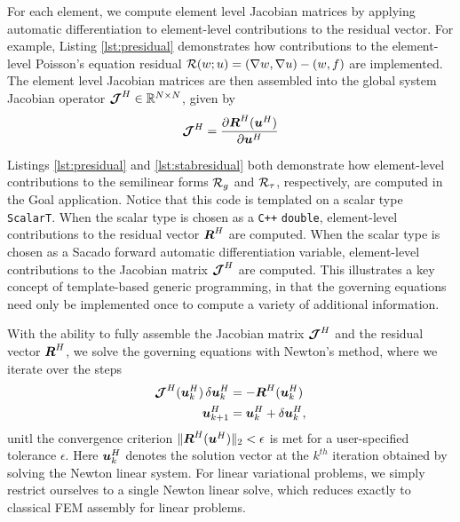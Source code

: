 For each element, we compute element level
Jacobian matrices by applying automatic
differentiation \cite{griewank2008evaluating} to element-level contributions
to the residual vector. For example, Listing \ref{lst:presidual} demonstrates
how contributions to the element-level Poisson's equation residual
$\mathcal{R}(w; u) = (\nabla w, \nabla u) - (w, f)$ are implemented. The element level
Jacobian matrices are then assembled into the global system Jacobian operator
$\boldsymbol{\mathcal{J}}^H \in \mathbb{R}^{N \times N}$, given by
%
\begin{gather}
\boldsymbol{\mathcal{J}}^H = \frac{\partial \boldsymbol{R}^H (\boldsymbol{u}^H) }{\partial \boldsymbol{u}^H}
\end{gather}

Listings \ref{lst:presidual} and \ref{lst:stabresidual} both demonstrate how
element-level contributions to the semilinear forms $\mathcal{R}_g$ and $\mathcal{R}_{\tau}$,
respectively, are computed in the Goal application. Notice that this code
is templated on a scalar type \texttt{ScalarT}. When the scalar type is
chosen as a \texttt{C++} \texttt{double}, element-level contributions to
the residual vector $\boldsymbol{R}^H$ are computed. When the scalar type is chosen
as a Sacado forward automatic differentiation variable, element-level
contributions to the Jacobian matrix $\boldsymbol{\mathcal{J}}^H$ are computed. This
illustrates a key concept of template-based generic programming, in that
the governing equations need only be implemented once to compute a variety
of additional information.

With the ability to fully assemble the Jacobian matrix $\boldsymbol{\mathcal{J}}^H$ and the
residual vector $\boldsymbol{R}^H$, we solve the governing equations with Newton's
method, where we iterate over the steps
%
\begin{gather}
\begin{aligned}
\boldsymbol{\mathcal{J}}^H (\boldsymbol{u}^H_k) \, \delta \boldsymbol{u}^H_k &=
- \boldsymbol{R}^H( \boldsymbol{u}^H_k) \\
\boldsymbol{u}^H_{k+1} &= \boldsymbol{u}^H_k + \delta \boldsymbol{u}^H_k,
\end{aligned}
\end{gather}
%
unitl the convergence criterion $\| \boldsymbol{R}^H(\boldsymbol{u}^H) \|_2 < \epsilon$ is met
for a user-specified tolerance $\epsilon$. Here $\boldsymbol{u}^H_k$ denotes the
solution vector at the $k^{th}$ iteration obtained by solving the Newton
linear system. For linear variational problems, we simply restrict ourselves
to a single Newton linear solve, which reduces exactly to classical FEM
assembly for linear problems.

